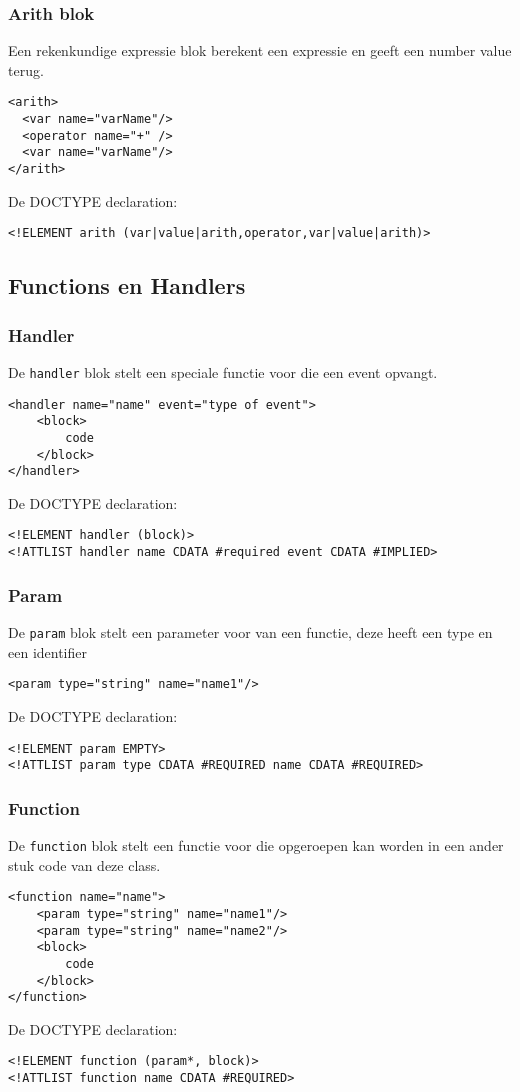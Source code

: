 \documentclass[]{article}
\begin{document}
\subsubsection{Arith blok}
Een rekenkundige expressie blok berekent een expressie en geeft een number value terug.
\lstset{language=XML}
\begin{lstlisting}
<arith>
  <var name="varName"/>
  <operator name="+" /> 
  <var name="varName"/>
</arith>
\end{lstlisting}
De DOCTYPE declaration: 
\lstset{language=XML}
\begin{lstlisting}
<!ELEMENT arith (var|value|arith,operator,var|value|arith)>
\end{lstlisting}
\subsection{Functions en Handlers}
\subsubsection{Handler}
De \texttt{handler} blok stelt een speciale functie voor die een event opvangt. 
\lstset{language=XML}
\begin{lstlisting}
<handler name="name" event="type of event">
	<block>
		code
	</block>
</handler>
\end{lstlisting}
De DOCTYPE declaration: 
\lstset{language=XML}
\begin{lstlisting}
<!ELEMENT handler (block)>
<!ATTLIST handler name CDATA #required event CDATA #IMPLIED>
\end{lstlisting}

\subsubsection{Param}
De \texttt{param} blok stelt een parameter voor van een functie, deze heeft een type en een identifier 
\lstset{language=XML}
\begin{lstlisting}
<param type="string" name="name1"/>

\end{lstlisting}
De DOCTYPE declaration: 
\lstset{language=XML}
\begin{lstlisting}
<!ELEMENT param EMPTY>
<!ATTLIST param type CDATA #REQUIRED name CDATA #REQUIRED>
\end{lstlisting}

\subsubsection{Function}
De \texttt{function} blok stelt een functie voor die opgeroepen kan worden in een ander stuk code van deze class. 
\lstset{language=XML}
\begin{lstlisting}
<function name="name">
	<param type="string" name="name1"/>
	<param type="string" name="name2"/>
	<block>
		code
	</block>
</function>
\end{lstlisting}
De DOCTYPE declaration: 
\lstset{language=XML}
\begin{lstlisting}
<!ELEMENT function (param*, block)>
<!ATTLIST function name CDATA #REQUIRED>
\end{lstlisting}
\end{document}
